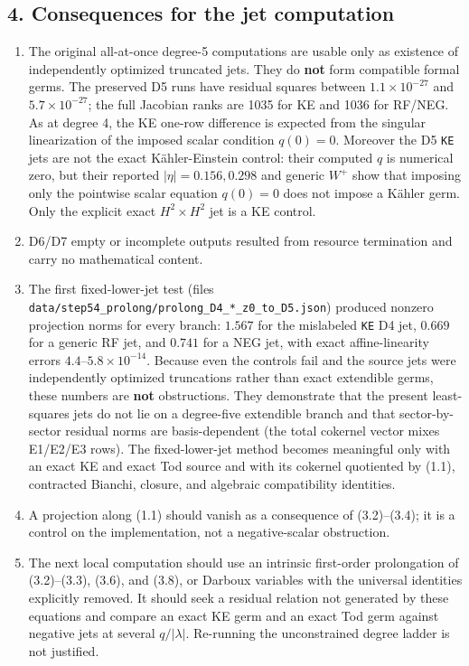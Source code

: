 \documentclass[
  10pt,
]{report}
\providecommand{\tightlist}{%
  \setlength{\itemsep}{0pt}\setlength{\parskip}{0pt}}
\begin{document}
\hypertarget{consequences-for-the-jet-computation}{%
\subsection{4. Consequences for the jet
computation}\label{consequences-for-the-jet-computation}}

\begin{enumerate}
\def\labelenumi{\arabic{enumi}.}
\tightlist
\item
  The original all-at-once degree-5 computations are usable only as
  existence of independently optimized truncated jets. They do
  \textbf{not} form compatible formal germs. The preserved D5 runs have
  residual squares between \(1.1\times10^{-27}\) and
  \(5.7\times10^{-27}\); the full Jacobian ranks are 1035 for KE and
  1036 for RF/NEG. As at degree 4, the KE one-row difference is expected
  from the singular linearization of the imposed scalar condition
  \(q(0)=0\). Moreover the D5 \texttt{KE} jets are not the exact
  Kähler-Einstein control: their computed \(q\) is numerical zero, but
  their reported \(|\eta|=0.156,0.298\) and generic \(W^+\) show that
  imposing only the pointwise scalar equation \(q(0)=0\) does not impose
  a Kähler germ. Only the explicit exact \(H^2\times H^2\) jet is a KE
  control.
\item
  D6/D7 empty or incomplete outputs resulted from resource termination
  and carry no mathematical content.
\item
  The first fixed-lower-jet test (files
  \texttt{data/step54\_prolong/prolong\_D4\_*\_z0\_to\_D5.json})
  produced nonzero projection norms for every branch: \(1.567\) for the
  mislabeled \texttt{KE} D4 jet, \(0.669\) for a generic RF jet, and
  \(0.741\) for a NEG jet, with exact affine-linearity errors
  \(4.4\)--\(5.8\times10^{-14}\). Because even the controls fail and the
  source jets were independently optimized truncations rather than exact
  extendible germs, these numbers are \textbf{not} obstructions. They
  demonstrate that the present least-squares jets do not lie on a
  degree-five extendible branch and that sector-by-sector residual norms
  are basis-dependent (the total cokernel vector mixes E1/E2/E3 rows).
  The fixed-lower-jet method becomes meaningful only with an exact KE
  and exact Tod source and with its cokernel quotiented by (1.1),
  contracted Bianchi, closure, and algebraic compatibility identities.
\item
  A projection along (1.1) should vanish as a consequence of
  (3.2)--(3.4); it is a control on the implementation, not a
  negative-scalar obstruction.
\item
  The next local computation should use an intrinsic first-order
  prolongation of (3.2)--(3.3), (3.6), and (3.8), or Darboux variables
  with the universal identities explicitly removed. It should seek a
  residual relation not generated by these equations and compare an
  exact KE germ and an exact Tod germ against negative jets at several
  \(q/|\lambda|\). Re-running the unconstrained degree ladder is not
  justified.
\end{enumerate}
\end{document}
